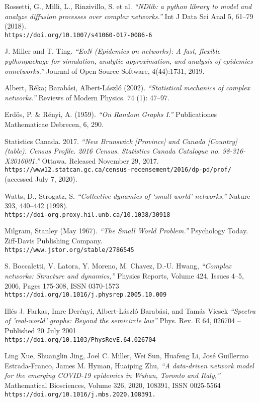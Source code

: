 \documentclass{article}
\numberwithin{equation}{section} %
\begin{document}
\begin{thebibliography}{9}
  Rossetti, G., Milli, L., Rinzivillo, S. et al. \textit{``NDlib: a python library to model and analyze diffusion processes over complex networks.''} Int J Data Sci Anal 5, 61–79 (2018).
  \\\texttt{https://doi.org/10.1007/s41060-017-0086-6}

  J. Miller and T. Ting. \textit{``EoN (Epidemics on networks): A fast, flexible pythonpackage for simulation, analytic approximation, and analysis of epidemics onnetworks.''} Journal of Open Source Software, 4(44):1731, 2019.

  Albert, Réka; Barabási, Albert-László (2002). \textit{``Statistical mechanics of complex networks.''} Reviews of Modern Physics. 74 (1): 47–97. 

  Erdös, P. \& Rényi, A. (1959). \textit{``On Random Graphs I.''} Publicationes Mathematicae Debrecen, 6, 290.

  Statistics Canada. 2017. \textit{``New Brunswick [Province] and Canada [Country] (table). Census Profile. 2016 Census. Statistics Canada Catalogue no. 98-316-X2016001.''} Ottawa. Released November 29, 2017.
  \\\texttt{https://www12.statcan.gc.ca/census-recensement/2016/dp-pd/prof/} (accessed July 7, 2020).

  Watts, D., Strogatz, S. \textit{``Collective dynamics of ‘small-world’ networks.''} Nature 393, 440–442 (1998).
  \\\texttt{https://doi-org.proxy.hil.unb.ca/10.1038/30918}

  Milgram, Stanley (May 1967). \textit{``The Small World Problem.''} Psychology Today. Ziff-Davis Publishing Company.
  \\\texttt{https://www.jstor.org/stable/2786545}

  S. Boccaletti, V. Latora, Y. Moreno, M. Chavez, D.-U. Hwang, \textit{``Complex networks: Structure and dynamics,''} Physics Reports, Volume 424, Issues 4–5, 2006, Pages 175-308, ISSN 0370-1573
  \\\texttt{https://doi.org/10.1016/j.physrep.2005.10.009}

  Illés J. Farkas, Imre Derényi, Albert-László Barabási, and Tamás Vicsek \textit{``Spectra of 'real-world' graphs: Beyond the semicircle law''} Phys. Rev. E 64, 026704 – Published 20 July 2001
  \\\texttt{https://doi.org/10.1103/PhysRevE.64.026704}

  Ling Xue, Shuanglin Jing, Joel C. Miller, Wei Sun, Huafeng Li, José Guillermo Estrada-Franco, James M. Hyman, Huaiping Zhu, \textit{``A data-driven network model for the emerging COVID-19 epidemics in Wuhan, Toronto and Italy,''} Mathematical Biosciences, Volume 326, 2020, 108391, ISSN 0025-5564
  \\\texttt{https://doi.org/10.1016/j.mbs.2020.108391.}
  
\end{thebibliography}
\end{document}
